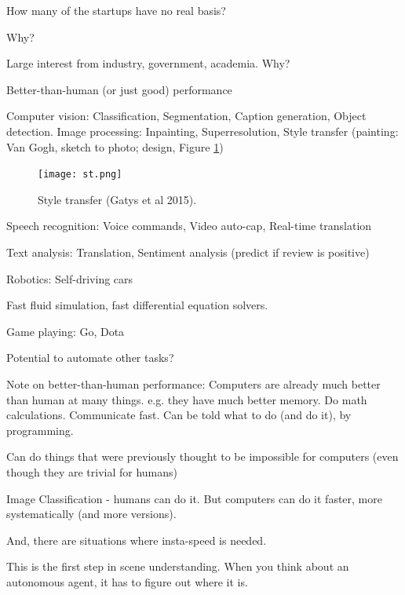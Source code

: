 \documentclass[english]{article}
\begin{document}
How many of the startups have no real basis? 
\eitem



\item Why?

\bitem
\item Large interest from industry, government, academia. Why?

\item Better-than-human (or just good) performance %
\bitem
\item Computer vision: Classification, Segmentation, Caption generation, Object detection. Image processing: Inpainting, Superresolution, Style transfer (painting: Van Gogh, sketch to photo; design, Figure \ref{st})%

\begin{figure}
  \centering
  \texttt{[image: st.png]}
  \caption{Style transfer (Gatys et al 2015).}
  \label{st}
\end{figure}

\item Speech recognition: Voice commands, Video auto-cap, Real-time translation
\item Text analysis: Translation, Sentiment analysis (predict if review is positive)
\item Robotics: Self-driving cars
\item Fast fluid simulation, fast differential equation solvers.
\item Game playing: Go, Dota
\eitem
\item Potential to automate other tasks?
\item Note on better-than-human performance: Computers are already much better than human at many things. e.g. they have much better memory. Do math calculations. Communicate fast. Can be told what to do (and do it), by programming.


\eitem

\bitem
\item Can do things that were previously thought to be impossible for computers (even though they are trivial for humans)

Image Classification - humans can do it. But computers can do it faster, more systematically (and more versions). 

And, there are situations where insta-speed is needed.

This is the first step in scene understanding. When you think about an autonomous agent, it has to figure out where it is. 
\end{document}

